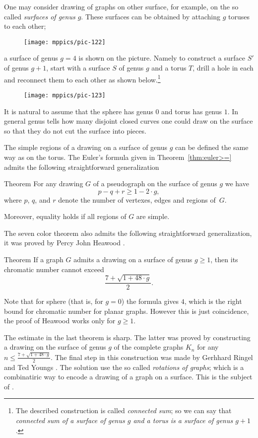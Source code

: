 One may consider drawing of graphs on other surface,
for example, on the so called \emph{surfaces of genus $g$}.
These surfaces can be obtained by attaching $g$ toruses to each other; 
\begin{figure}[h!]%
\vskip-0mm
\centering
\texttt{[image: mppics/pic-122]}
\vskip-0mm
\end{figure}
a surface of genus $g=4$ is shown on the picture.
Namely to construct a surface $S'$ of genus $g+1$, start with a surface $S$ of genus $g$ and a torus $T$, drill a hole in each and reconnect them to each other as shown below.\footnote{The described construction is called \emph{connected sum}; so we can say that {}\emph{connected sum of a surface of genus $g$ and a torus is a surface of genus $g+1$}.}
\begin{figure}[h!]%
\vskip-0mm
\centering
\texttt{[image: mppics/pic-123]}
\vskip-0mm
\end{figure}


It is natural to assume that the sphere has genus $0$ and torus has genus $1$.
In general genus tells how many disjoint closed curves one could draw on the surface so that they do not cut the surface into pieces.

The simple regions of a drawing on a surface of genus $g$ can be defined the same way as on the torus.
The Euler's formula given in Theorem~\ref{thm:euler>=} admits the following straightforward generalization

\begin{thm}{Theorem}\label{thm:euler>=}
For any drawing $G$ of a pseudograph on the surface of genus $g$ we have
\[p-q+r\ge 1-2\cdot g,\]
where $p$, $q$, and $r$ denote the number of vertexes, edges and regions of~$G$.

Moreover, equality holds if all regions of $G$ are simple.
\end{thm}

The seven color theorem also admits the following straightforward generalization, it was proved by Percy John Heawood \cite{heawood}.

\begin{thm}{Theorem}
If a graph $G$ admits a drawing on a surface of genus $g\ge 1$, 
then its chromatic number cannot exceed 
\[\frac{7+\sqrt{1+48\cdot g}}2.\]
\end{thm}

Note that for sphere (that is, for $g=0$) the formula gives $4$, which is the right bound for chromatic number for planar graphs. 
However this is just coincidence, the proof of Heawood works only for $g\ge 1$.

The estimate in the last theorem is sharp.
The latter was proved by constructing a drawing on the surface of genus $g$
of the complete graphs $K_n$ for any $n\le\frac{7+\sqrt{1+48\cdot g}}2$.
The final step in this construction was made by Gerhhard Ringel and Ted Youngs \cite{ringel-youngs}.
The solution use the so called \emph{rotations of graphs}; which is a combinatiric way to encode a drawing of a graph on a surface.
This is the subject of \cite[Chapter 10]{hartsfield-ringel}.


